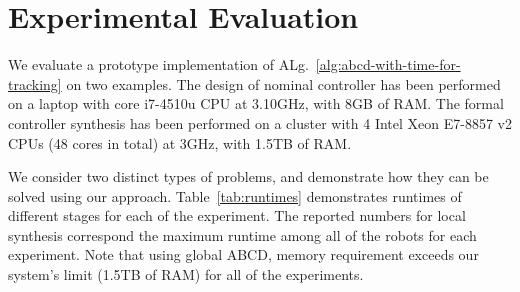
\section{Experimental Evaluation}\label{sec:experiments}
We evaluate a prototype implementation of ALg.~\ref{alg:abcd-with-time-for-tracking}
on two examples. 
The design of nominal controller has been performed on a laptop with core i7-4510u CPU at 3.10GHz, with 8GB of
RAM.
The formal controller synthesis has been performed
on a cluster with 4 Intel Xeon E7-8857 v2 CPUs (48 cores in total) at 3GHz, with 1.5TB of
RAM. %

We consider two distinct types of problems, and demonstrate how they can be solved using our approach. Table~\ref{tab:runtimes} demonstrates  runtimes of different stages for each of the experiment. The reported numbers for local synthesis correspond the maximum runtime among all of the robots for each experiment. Note that using global ABCD, memory requirement exceeds our system's limit (1.5TB of RAM) for all of the experiments. 

